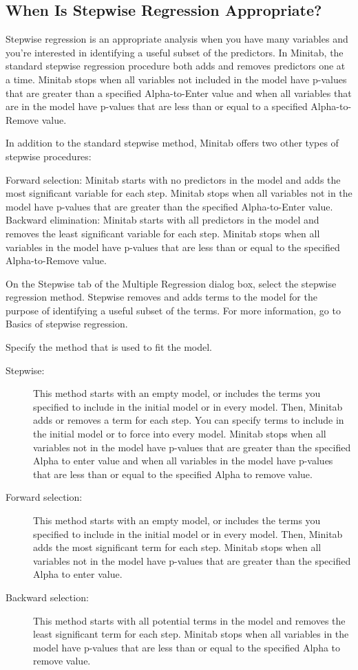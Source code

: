\documentclass[]{report}
\begin{document}
\subsection*{When Is Stepwise Regression Appropriate?}

Stepwise regression is an appropriate analysis when you have many variables and you’re interested in identifying a useful subset of the predictors. In Minitab, the standard stepwise regression procedure both adds and removes predictors one at a time. Minitab stops when all variables not included in the model have p-values that are greater than a specified Alpha-to-Enter value and when all variables that are in the model have p-values that are less than or equal to a specified Alpha-to-Remove value.

In addition to the standard stepwise method, Minitab offers two other types of stepwise procedures:

Forward selection:  Minitab starts with no predictors in the model and adds the most significant variable for each step. Minitab stops when all variables not in the model have p-values that are greater than the specified Alpha-to-Enter value.
Backward elimination:  Minitab starts with all predictors in the model and removes the least significant variable for each step. Minitab stops when all variables in the model have p-values that are less than or equal to the specified Alpha-to-Remove value.


On the Stepwise tab of the Multiple Regression dialog box, select the stepwise regression method.
Stepwise removes and adds terms to the model for the purpose of identifying a useful subset of the terms. For more information, go to Basics of stepwise regression.

Specify the method that is used to fit the model.
\begin{description}
\item[Stepwise:] This method starts with an empty model, or includes the terms you specified to include in the initial model or in every model. Then, Minitab adds or removes a term for each step. You can specify terms to include in the initial model or to force into every model. Minitab stops when all variables not in the model have p-values that are greater than the specified Alpha to enter value and when all variables in the model have p-values that are less than or equal to the specified Alpha to remove value.
\item[Forward selection:] This method starts with an empty model, or includes the terms you specified to include in the initial model or in every model. Then, Minitab adds the most significant term for each step. Minitab stops when all variables not in the model have p-values that are greater than the specified Alpha to enter value.
\item[Backward selection:] This method starts with all potential terms in the model and removes the least significant term for each step. Minitab stops when all variables in the model have p-values that are less than or equal to the specified Alpha to remove value.
\end{description}
\end{document}
